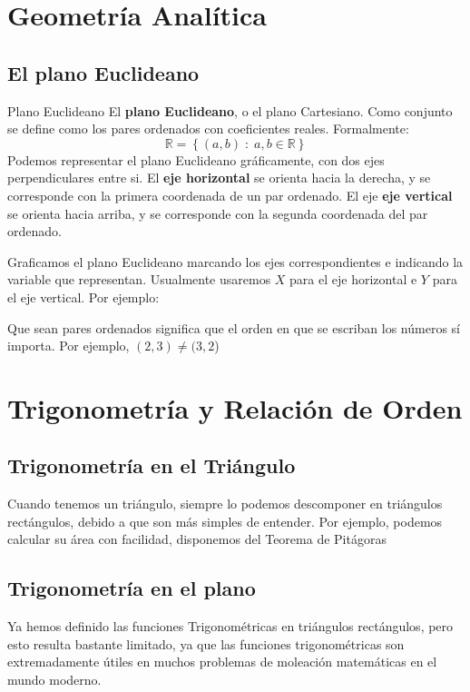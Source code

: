 \documentclass[11pt, twoside]{book}%
\newcommand{\set}[1]{\left\lbrace #1 \right\rbrace}
\begin{document}
\chapter{Geometría Analítica}
\section{El plano Euclideano}
\begin{definition}{Plano Euclideano}
El \textbf{plano Euclideano}, o el plano Cartesiano. Como conjunto se define como los pares ordenados con coeficientes reales. Formalmente:
    \[\mathbb{R}=\set{(a,b)\;:\;a,b\in\mathbb{R}}\]
Podemos representar el plano Euclideano gráficamente, con dos ejes perpendiculares entre si. El \textbf{eje horizontal} se orienta hacia la derecha, y se corresponde con la primera coordenada de un par ordenado.
El eje \textbf{eje vertical} se orienta hacia arriba, y se corresponde con la segunda coordenada del par ordenado.

Graficamos el plano Euclideano marcando los ejes correspondientes e indicando la variable que representan. Usualmente usaremos \(X\) para el eje horizontal e \(Y\) para el eje vertical.
Por ejemplo:
\end{definition}

\begin{note}
    Que sean pares ordenados significa que el orden en que se escriban los números sí importa. Por ejemplo,
    \((2,3)\neq (3,2\))
\end{note}


\chapter{Trigonometría y Relación de Orden}
\section{Trigonometría en el Triángulo}
Cuando tenemos un triángulo, siempre lo podemos descomponer en triángulos rectángulos, debido a que son más simples de entender.
Por ejemplo, podemos calcular su área con facilidad, disponemos del Teorema de Pitágoras

\section{Trigonometría en el plano}
Ya hemos definido las funciones Trigonométricas en triángulos rectángulos, pero esto resulta bastante limitado, ya que las funciones trigonométricas son extremadamente útiles en muchos problemas de moleación matemáticas en el mundo moderno.
\end{document}
